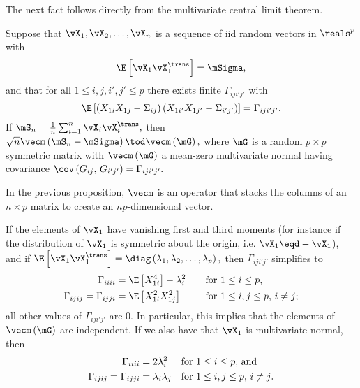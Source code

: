 The next fact follows directly from the multivariate central limit theorem.

\begin{proposition}\label{P:sample-cov-limit}
Suppose that 
\(
    \vX_1, \vX_2, \ldots, \vX_n
\)
is a sequence of iid random vectors in $\reals^p$ with 
\[
    \E \left[
        \vX_1 \vX_1^\trans
    \right]
    =
    \mSigma,
\]
and that for all $1 \leq i,j,i',j' \leq p$ there exists finite
\(
    \Gamma_{iji'j'}
\)
with
\[
    \E \left[
        \left(
            X_{1i} X_{1j}
            -
            \Sigma_{ij}
        \right)
        \left(
            X_{1i'} X_{1j'}
            -
            \Sigma_{i'j'}
        \right)
    \right]
    =
    \Gamma_{iji'j'}.
\]
If
\(
    \mS_n
    =
    \frac{1}{n}
    \sum_{i=1}^n
        \vX_i \vX_i^\trans,
\)
then
\(
    \sqrt{n}
    \vecm \left( 
        \mS_n - \mSigma 
    \right)
    \tod
    \vecm \left( 
        \mG
    \right),
\)
where $\mG$ is a random $p \times p$ symmetric matrix with 
\(
    \vecm \left( \mG \right)
\)
a mean-zero multivariate normal having covariance
\(
    \cov \left(
        G_{ij}, \,
        G_{i'j'}
    \right)
    =
    \Gamma_{iji'j'}.
\)
\end{proposition}

\noindent
In the previous proposition, $\vecm$ is an operator that stacks the columns of
an $n\times p$ matrix to create an $n p$-dimensional vector.

If the elements of $\vX_1$ have vanishing first and third moments (for instance if
the distribution of $\vX_1$ is symmetric about the origin, i.e.
\(
    \vX_1 \eqd - \vX_1
\)),
and if
\(
    \E \left[
        \vX_1 \vX_1^\trans
    \right]
    =
    \diag \left(
        \lambda_1,
        \lambda_2,
        \ldots,
        \lambda_p
    \right),
\)
then $\Gamma_{iji'j'}$ simplifies to
\begin{subequations}
\begin{align}
    \Gamma_{iiii} &= \E \left[ X_{1i}^4 \right] - \lambda_i^2 \quad 
                         &&\text{for $1 \leq i \leq p$}, \\
    \Gamma_{ijij} = \Gamma_{ijji} &= \E \left[ X_{1i}^2 X_{1j}^2 \right]
                         &&\text{for $ 1 \leq i,j \leq p$, $i \neq j$;}
\end{align}
\end{subequations}
all other values of $\Gamma_{iji'j'}$ are $0$.  In particular, this
implies that the elements of $\vecm \left( \mG \right)$ are independent.
If we also have that $\vX_1$ is multivariate normal, then 
\begin{subequations}
\begin{align}
    \Gamma_{iiii} &= 2 \lambda_i^2
                         &&\text{for $1 \leq i \leq p$, and} \\    
    \Gamma_{ijij} = \Gamma_{ijji} &= \lambda_i \lambda_j
                         &&\text{for $ 1 \leq i,j \leq p$, $i \neq j$.}
\end{align}
\end{subequations}


